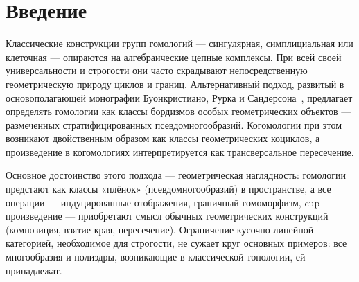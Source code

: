 \documentclass[12pt, twoside]{article}
\begin{document}
\pagestyle{empty}



\begin{abstract}
В курсовой работе излагается геометрический подход к гомологиям и когомологиям полиэдров, восходящий к монографии Буонкристиано, Рурка и Сандерсона~\cite{BRS} и дополненный вычислительными приёмами из книги Фенна~\cite{Fenn}. Гомологические классы реализуются как классы бордизмов размеченных стратифицированных псевдомногообразий, а когомологии --- как коориентированные коциклы. Cup-произведение интерпретируется как трансверсальное пересечение. Приводятся основные определения, доказывается эквивалентность сингулярным гомологиям и демонстрируются примеры вычислений.

Данная работа является частью проекта по созданию учебника по введению в геометрическую топологию, рассчитанного на студентов младших курсов и мотивированных школьников. В курсовой работе представлена часть будущей книги, посвящённая основаниям геометрических гомологий и когомологий.
\end{abstract}
\newpage

\tableofcontents
\pagestyle{empty}
\pagebreak
\pagestyle{fancy}

\section{Введение}

Классические конструкции групп гомологий --- сингулярная, симплициальная или клеточная --- опираются на алгебраические цепные комплексы. При всей своей универсальности и строгости они часто скрадывают непосредственную геометрическую природу циклов и границ. Альтернативный подход, развитый в основополагающей монографии Буонкристиано, Рурка и Сандерсона~\cite{BRS}, предлагает определять гомологии как классы бордизмов особых геометрических объектов --- размеченных стратифицированных псевдомногообразий. Когомологии при этом возникают двойственным образом как классы геометрических коциклов, а произведение в когомологиях интерпретируется как трансверсальное пересечение.

Основное достоинство этого подхода --- геометрическая наглядность: гомологии предстают как классы «плёнок» (псевдомногообразий) в пространстве, а все операции --- индуцированные отображения, граничный гомоморфизм, cup-произведение --- приобретают смысл обычных геометрических конструкций (композиция, взятие края, пересечение). Ограничение кусочно-линейной категорией, необходимое для строгости, не сужает круг основных примеров: все многообразия и полиэдры, возникающие в классической топологии, ей принадлежат.
\end{document}

